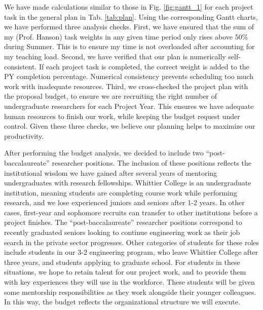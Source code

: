 \documentclass[10pt]{amsart}
\theoremstyle{definition}
\numberwithin{equation}{section}
\begin{document}
We have made calculations similar to those in Fig. \ref{fig:gantt_1} for each project task in the general plan in Tab. \ref{tab:plan}.  Using the corresponding Gantt charts, we have performed three analysis checks.  First, we have ensured that the sum of my (Prof. Hanson) task weights in any given time period only rises above $50\%$ during Summer.  This is to ensure my time is not overloaded after accounting for my teaching load.  Second, we have verified that our plan is numerically self-consistent.  If each project task is completed, the correct weight is added to the PY completion percentage.  Numerical consistency prevents scheduling too much work with inadequate resources.  Third, we cross-checked the project plan with the proposal budget, to ensure we are recruiting the right number of undergraduate researchers for each Project Year.  This ensures we have adequate human resources to finish our work, while keeping the budget request under control.  Given these three checks, we believe our planning helps to maximize our productivity.

After performing the budget analysis, we decided to include two ``post-baccalaureate'' researcher positions.  The inclusion of these positions reflects the institutional wisdom we have gained after several years of mentoring undergraduates with research fellowships.  Whittier College is an undergraduate institution, meaning students are completing course work while performing research, and we lose experienced juniors and seniors after 1-2 years.  In other cases, first-year and sophomore recruits can transfer to other institutions before a project finishes.  The ``post-baccalaureate'' researcher positions correspond to recently graduated seniors looking to continue engineering work as their job search in the private sector progresses.  Other categories of students for these roles include students in our 3-2 engineering program, who leave Whittier College after three years, and students applying to graduate school. For students in these situations, we hope to retain talent for our project work, and to provide them with key experiences they will use in the workforce.  These students will be given some mentorship responsibilities as they work alongside their younger colleagues.  In this way, the budget reflects the organizational structure we will execute.
\end{document}
